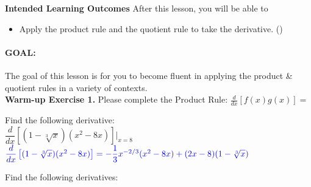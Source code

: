 \documentclass[10pt]{article}
\begin{document}
\pagestyle{otherpages}
\thispagestyle{firstpage}

\textbf{Intended Learning Outcomes}
After this lesson, you will be able to 

\begin{itemize}
    \item Apply the product rule and the quotient rule to take the derivative. ()
\end{itemize}

\vspace{-0.5cm}

\hrulefill

\paragraph*{GOAL:} The goal of this lesson is for you to become fluent in applying the product \& quotient rules in a variety of contexts.\\

{\bf\color{blue}Warm-up Exercise 1.} Please complete the Product Rule: $\displaystyle \frac{d}{dx}[f(x)g(x)]=$   

{} Find the following derivative:\\

$\dfrac{d}{dx}\left[(1-\sqrt[3]{x})(x^2-8x)\right]\bigg|_{x=8}$\\

${\color{blue}\dfrac{d}{dx}\left[(1-\sqrt[3]{x})(x^2-8x)\right]=-\dfrac{1}{3}x^{-2/3}(x^2-8x)+(2x-8)(1-\sqrt[3]{x})}$


\vfill

{} Find the following derivatives:\\
\end{document}
